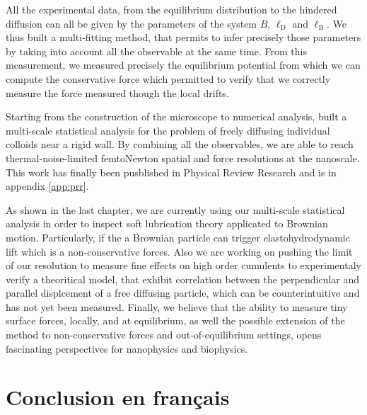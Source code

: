 All the experimental data, from the equilibrium distribution to the hindered diffusion can all be given by the parameters of the system $B$, $\ell _\mathrm{D}$ and $\ell_\mathrm{B}$. We thus built a multi-fitting method, that permits to infer precisely those parameters by taking into account all the observable at the same time. From this measurement, we measured precisely the equilibrium potential from which we can compute the conservative force which permitted to verify that we correctly measure the force measured though the local drifts.

Starting from the construction of the microscope to numerical analysis, built a multi-scale statistical analysis for the problem of freely diffusing individual colloids near a rigid wall. By combining all the observables, we are able to reach thermal-noise-limited femtoNewton spatial and force resolutions at the nanoscale. This work has finally been pusblished in Physical Review Research and is in appendix \ref{app:prr}.

As shown in the last chapter, we are currently using our multi-scale statistical analysis in order to inspect soft lubrication theory applicated to Brownian motion. Particularly, if the a Brownian particle can trigger elastohydrodynamic lift which is a non-conservative forces. Also we are working on pushing the limit of our resolution to measure fine effects on high order cumulents to experimentaly verify a theoritical model, that exhibit correlation between the perpendicular and parallel displcement of a free diffusing particle, which can be counterintuitive and has not yet been measured. Finally, we believe that the ability to measure tiny surface forces, locally, and at equilibrium, as well the possible extension of the method to non-conservative forces and out-of-equilibrium settings, opens fascinating perspectives for nanophysics and biophysics.

\section{Conclusion en français}

